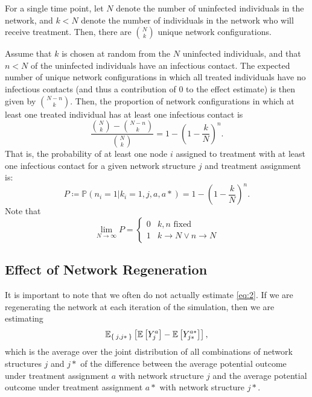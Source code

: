 \documentclass{article}
\theoremstyle{definition}
\begin{document}
For a single time point, let $N$ denote the number of uninfected individuals in the network, and $k <N$ denote the number of individuals in the network who will receive treatment. Then, there are $\binom{N}{k}$ unique network configurations.

Assume that $k$ is chosen at random from the $N$ uninfected individuals, and that $n<N$ of the uninfected individuals have an infectious contact. The expected number of unique network configurations  in which all treated individuals have no infectious contacts (and thus a contribution of 0 to the effect estimate) is then given by $\binom{N-n}{k}$. Then, the proportion of network configurations in which at least one treated individual has at least one infectious contact is 
\begin{equation}\label{eq:6}
    \frac{{\binom{N}{k}}-{\binom{N-n}{k}}}{{\binom{N}{k}}}=1-\left(1-\frac{k}{N}\right)^{n}.
\end{equation}
That is, the probability of at least one node $i$ assigned to treatment with at least one infectious contact for a given network structure $j$ and treatment assignment is:
\begin{equation}\label{eq:7}
    P \coloneqq \mathbb{P}\left(n_{i}=1 \vert k_{i}=1,j,a,a*\right)=1-\left(1-\frac{k}{N}\right)^{n}.
\end{equation}
Note that 
\begin{equation}\label{eq:8}
    \lim_{N \to \infty}P=\begin{cases}0 & k,n \text{ fixed} \\ 1 & k \to N \lor n \to N  \end{cases}
\end{equation}

\subsection{Effect of Network Regeneration}
It is important to note that we often do not actually estimate \ref{eq:2}. If we are regenerating the network at each iteration of the simulation, then we are estimating \begin{equation}\label{eq:9}
    \mathbb{E}_{\Set{j,j*}}\left[\mathbb{E}\left[Y_{j}^{a}\right]-\mathbb{E}\left[Y_{j*}^{a*}\right]\right],
\end{equation} 
which is the average over the joint distribution of all combinations of network structures $j$ and $j*$ of the difference between the average potential outcome under treatment assignment $a$ with network structure $j$ and the average potential outcome under  treatment assignment $a*$ with network structure $j*$.
\end{document}
